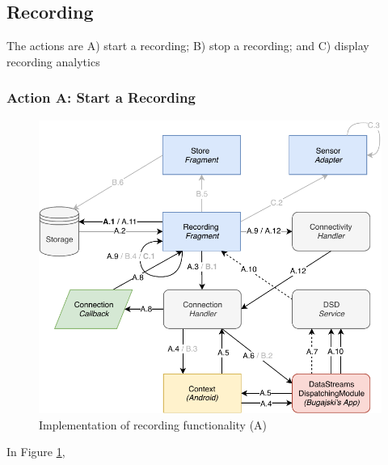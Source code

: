\subsection{Recording}

The actions are A) start a recording; B) stop a recording; and C) display recording analytics

\subsubsection{Action A: Start a Recording}
\begin{figure}
    \centering
    \includegraphics[scale=0.7]{images/Recording_ImpA.pdf}
    \caption{Implementation of recording functionality (A)}
    \label{fig:impl_recordingA}
\end{figure}

In Figure \ref{fig:impl_recordingA}, 

